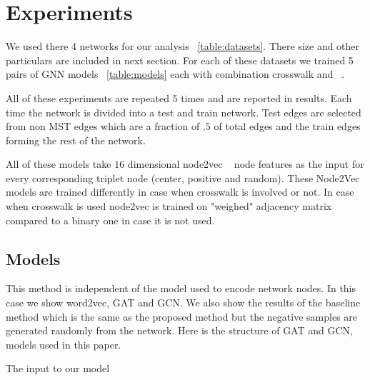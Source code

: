 \documentclass[sigconf,authordraft]{acmart}
\begin{document}
\section{Experiments}
We used there 4 networks for our analysis ~\ref{table:datasets}. There size and other particulars are included in next section. For each of these datasets we trained 5 pairs of GNN models ~\ref{table:models} each with combination crosswalk and ~.

All of these experiments are repeated 5 times and are reported in results. Each time the network is divided into a test and train network. Test edges are selected from non MST edges which are a fraction of $.5$ of total edges and the train edges forming the rest of the network.

All of these models take $16$ dimensional node2vec ~\cite{grover_node2vec_2016} node features as the input for every corresponding triplet node (center, positive and random). These Node2Vec models are trained differently in case when crosswalk is involved or not. In case when crosswalk is used node2vec is trained on "weighed" adjacency matrix compared to a binary one in case it is not used.

\subsection{Models}

This method is independent of the model used to encode network nodes. In this case we show word2vec, GAT and GCN. We also show the results of the baseline method which is the same as the proposed method but the negative samples are generated randomly from the network. Here is the structure of GAT and GCN, models used in this paper.

The input to our model 

\end{document}
